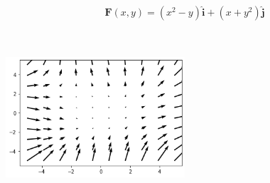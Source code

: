 \begin{align*}
    \boldsymbol{F}(x, y) = (x^2 - y) \boldsymbol{\hat{i}} + (x + y^2) \boldsymbol{\hat{j}}
\end{align*}

\begin{solution}\
\begin{center}
    \includegraphics[width=0.5\textwidth]{img/e3p3.png}
\end{center}
\end{solution}